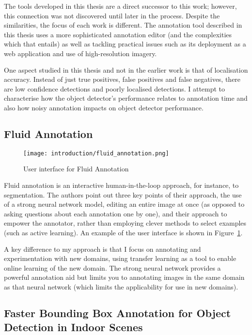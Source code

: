 The tools developed in this thesis are a direct successor to this work; however, this connection was not discovered until later in the process. 
Despite the similarities, the focus of each work is different. The annotation tool described in this thesis uses a more sophisticated annotation editor (and the complexities which that entails) as well as tackling practical issues such as its deployment as a web application and use of high-resolution imagery.

One aspect studied in this thesis and not in the earlier work is that of localisation accuracy. Instead of just true positives, false positives and false negatives, there are low confidence detections and poorly localised detections. I attempt to characterise how the object detector's performance relates to annotation time and also how noisy annotation impacts on object detector performance.


\subsection{Fluid Annotation \texorpdfstring{\cite{Andriluka2018}}{}}
\begin{figure}[h]
  \centering
  \texttt{[image: introduction/fluid\_annotation.png]}
  \caption{User interface for Fluid Annotation \cite{Andriluka2018}}  
  \label{fig:fluid_annotation}
\end{figure}

Fluid annotation \cite{Andriluka2018} is an interactive human-in-the-loop approach, for instance, to segmentation. The authors point out three key points of their approach, the use of a strong neural network model, editing an entire image at once (as opposed to asking questions about each annotation one by one), and their approach to empower the annotator, rather than employing clever methods to select examples (such as active learning). An example of the user interface is shown in Figure~\ref{fig:fluid_annotation}.

A key difference to my approach is that I focus on annotating and experimentation with new domains, using transfer learning as a tool to enable online learning of the new domain. The strong neural network provides a powerful annotation aid but limits you to annotating images in the same domain as that neural network (which limits the applicability for use in new domains).

\subsection{Faster Bounding Box Annotation for Object Detection in Indoor Scenes  \texorpdfstring{\cite{Adhikaria2018}}{}}

